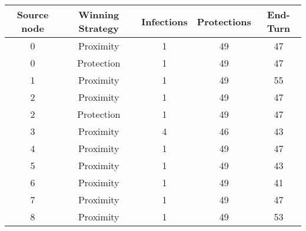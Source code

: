 \documentclass[results.tex]{subfiles}
\begin{document}
    \begin{center}
        \begin{tabular}{| c || c | c | c | c |}
            \hline
            {\bfseries Source node} & {\bfseries Winning Strategy} & {\bfseries Infections} & {\bfseries Protections}
            & {\bfseries End-Turn}
            \\  %
            \hline\hline
            0                       & Proximity                    & 1                      & 49                      & 47                   \\
            \hline
            0                       & Protection                   & 1                      & 49                      & 47                   \\
            \hline
            1                       & Proximity                    & 1                      & 49                      & 55                   \\
            \hline
            2                       & Proximity                    & 1                      & 49                      & 47                   \\
            \hline
            2                       & Protection                   & 1                      & 49                      & 47                   \\
            \hline
            3                       & Proximity                    & 4                      & 46                      & 43                   \\
            \hline
            4                       & Proximity                    & 1                      & 49                      & 47                   \\
            \hline
            5                       & Proximity                    & 1                      & 49                      & 43                   \\
            \hline
            6                       & Proximity                    & 1                      & 49                      & 41                   \\
            \hline
            7                       & Proximity                    & 1                      & 49                      & 47                   \\
            \hline
            8                       & Proximity                    & 1                      & 49                      & 53                   \\

\end{tabular}
\end{center}
\end{document}
